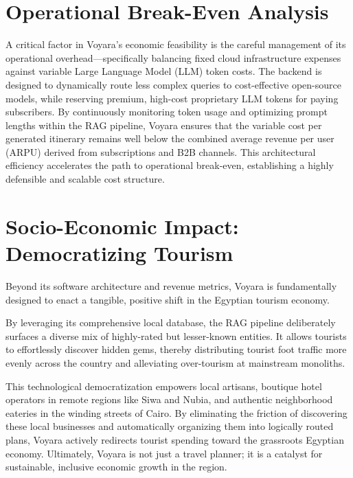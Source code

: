 \section{Operational Break-Even Analysis}
A critical factor in Voyara's economic feasibility is the careful management of its operational overhead—specifically balancing fixed cloud infrastructure expenses against variable Large Language Model (LLM) token costs. The backend is designed to dynamically route less complex queries to cost-effective open-source models, while reserving premium, high-cost proprietary LLM tokens for paying subscribers. By continuously monitoring token usage and optimizing prompt lengths within the RAG pipeline, Voyara ensures that the variable cost per generated itinerary remains well below the combined average revenue per user (ARPU) derived from subscriptions and B2B channels. This architectural efficiency accelerates the path to operational break-even, establishing a highly defensible and scalable cost structure.

\section{Socio-Economic Impact: Democratizing Tourism}
Beyond its software architecture and revenue metrics, Voyara is fundamentally designed to enact a tangible, positive shift in the Egyptian tourism economy. 

By leveraging its comprehensive local database, the RAG pipeline deliberately surfaces a diverse mix of highly-rated but lesser-known entities. It allows tourists to effortlessly discover hidden gems, thereby distributing tourist foot traffic more evenly across the country and alleviating over-tourism at mainstream monoliths.

This technological democratization empowers local artisans, boutique hotel operators in remote regions like Siwa and Nubia, and authentic neighborhood eateries in the winding streets of Cairo. By eliminating the friction of discovering these local businesses and automatically organizing them into logically routed plans, Voyara actively redirects tourist spending toward the grassroots Egyptian economy. Ultimately, Voyara is not just a travel planner; it is a catalyst for sustainable, inclusive economic growth in the region.

